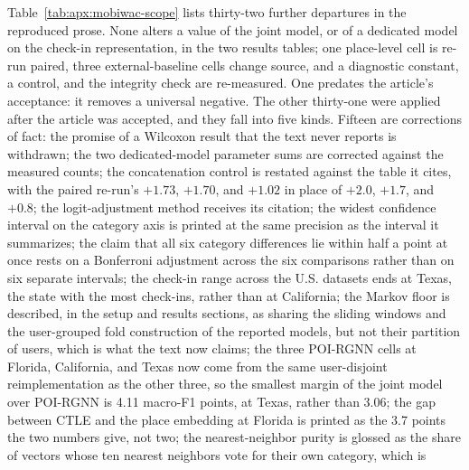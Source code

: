 Table~\ref{tab:apx:mobiwac-scope} lists thirty-two further departures in the reproduced prose.
None alters a value of the joint model, or of a dedicated model on the check-in representation,
in the two results tables; one place-level cell is re-run paired, three external-baseline cells
change source, and a diagnostic constant, a control, and the integrity check are re-measured. One predates the article's acceptance: it removes a
universal negative. The
other thirty-one were applied after the article was accepted, and they fall into five kinds. Fifteen
are corrections of fact: the promise of a Wilcoxon result that the text never reports is
withdrawn; the two dedicated-model parameter sums are corrected against the measured counts;
the concatenation control is restated against the table it cites, with the paired re-run's $+1.73$,
$+1.70$, and $+1.02$ in place of $+2.0$, $+1.7$, and $+0.8$; the logit-adjustment method
receives its citation; the widest confidence interval on the category axis is
printed at the same precision as the interval it summarizes; the claim that all six category
differences lie within half a point at once rests on a Bonferroni adjustment across the six
comparisons rather than on six separate intervals; the check-in range across the
U.S. datasets ends at Texas, the state with the most check-ins, rather than at California; the
Markov floor is described, in the setup and results sections, as sharing the sliding windows and the
user-grouped fold construction of the reported models, but not their partition of users, which is
what the text now claims; the three POI-RGNN cells at Florida, California, and Texas now come from the same user-disjoint
reimplementation as the other three, so the smallest margin of the joint model over POI-RGNN is
4.11 macro-F1 points, at Texas, rather than 3.06; the gap between CTLE and the place embedding at
Florida is printed as the 3.7 points the two numbers give, not two; the nearest-neighbor purity is
glossed as the share of vectors whose ten nearest neighbors vote for their own category, which is
